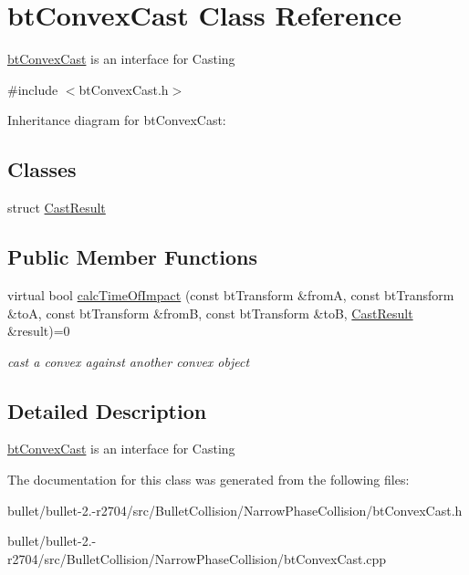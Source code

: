 \hypertarget{classbt_convex_cast}{\section{bt\+Convex\+Cast Class Reference}
\label{classbt_convex_cast}
}


\hyperlink{classbt_convex_cast}{bt\+Convex\+Cast} is an interface for Casting  




{\ttfamily \#include $<$bt\+Convex\+Cast.\+h$>$}



Inheritance diagram for bt\+Convex\+Cast\+:
\subsection*{Classes}
\begin{DoxyCompactItemize}
\item 
struct \hyperlink{structbt_convex_cast_1_1_cast_result}{Cast\+Result}
\end{DoxyCompactItemize}
\subsection*{Public Member Functions}
\begin{DoxyCompactItemize}
\item 
\hypertarget{classbt_convex_cast_abaf0f25a8cccfcafdaabada83c8d2bfb}{virtual bool \hyperlink{classbt_convex_cast_abaf0f25a8cccfcafdaabada83c8d2bfb}{calc\+Time\+Of\+Impact} (const bt\+Transform \&from\+A, const bt\+Transform \&to\+A, const bt\+Transform \&from\+B, const bt\+Transform \&to\+B, \hyperlink{structbt_convex_cast_1_1_cast_result}{Cast\+Result} \&result)=0}\label{classbt_convex_cast_abaf0f25a8cccfcafdaabada83c8d2bfb}

\begin{DoxyCompactList}\small\item\em cast a convex against another convex object \end{DoxyCompactList}\end{DoxyCompactItemize}


\subsection{Detailed Description}
\hyperlink{classbt_convex_cast}{bt\+Convex\+Cast} is an interface for Casting 

The documentation for this class was generated from the following files\+:\begin{DoxyCompactItemize}
\item 
bullet/bullet-\/2.-\/r2704/src/\+Bullet\+Collision/\+Narrow\+Phase\+Collision/bt\+Convex\+Cast.\+h\item 
bullet/bullet-\/2.-\/r2704/src/\+Bullet\+Collision/\+Narrow\+Phase\+Collision/bt\+Convex\+Cast.\+cpp\end{DoxyCompactItemize}
